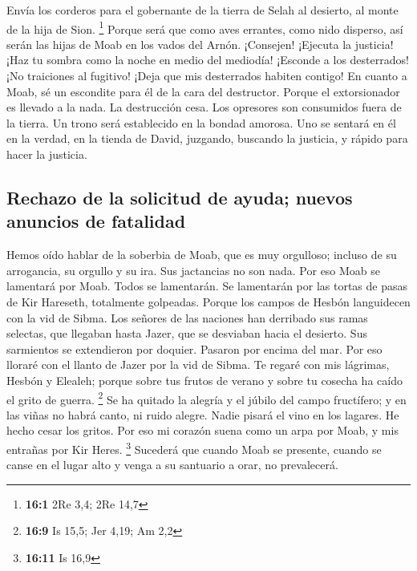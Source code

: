 \begin{paracol}{2}
 Envía los corderos para el gobernante de la tierra de
Selah al desierto, al monte de la hija de Sion. \footnote{\textbf{16:1}
  2Re 3,4; 2Re 14,7}  Porque será que como aves errantes,
como nido disperso, así serán las hijas de Moab en los vados del Arnón.
 ¡Consejen! ¡Ejecuta la justicia! ¡Haz tu sombra como la
noche en medio del mediodía! ¡Esconde a los desterrados! ¡No traiciones
al fugitivo!  ¡Deja que mis desterrados habiten contigo!
En cuanto a Moab, sé un escondite para él de la cara del destructor.
Porque el extorsionador es llevado a la nada. La destrucción cesa. Los
opresores son consumidos fuera de la tierra.  Un trono
será establecido en la bondad amorosa. Uno se sentará en él en la
verdad, en la tienda de David, juzgando, buscando la justicia, y rápido
para hacer la justicia.

\hypertarget{rechazo-de-la-solicitud-de-ayuda-nuevos-anuncios-de-fatalidad}{%
\subsection{Rechazo de la solicitud de ayuda; nuevos anuncios de
fatalidad}\label{rechazo-de-la-solicitud-de-ayuda-nuevos-anuncios-de-fatalidad}}

 Hemos oído hablar de la soberbia de Moab, que es muy
orgulloso; incluso de su arrogancia, su orgullo y su ira. Sus jactancias
no son nada.  Por eso Moab se lamentará por Moab. Todos se
lamentarán. Se lamentarán por las tortas de pasas de Kir Hareseth,
totalmente golpeadas.  Porque los campos de Hesbón
languidecen con la vid de Sibma. Los señores de las naciones han
derribado sus ramas selectas, que llegaban hasta Jazer, que se desviaban
hacia el desierto. Sus sarmientos se extendieron por doquier. Pasaron
por encima del mar.  Por eso lloraré con el llanto de
Jazer por la vid de Sibma. Te regaré con mis lágrimas, Hesbón y Elealeh;
porque sobre tus frutos de verano y sobre tu cosecha ha caído el grito
de guerra. \footnote{\textbf{16:9} Is 15,5; Jer 4,19; Am 2,2}
 Se ha quitado la alegría y el júbilo del campo
fructífero; y en las viñas no habrá canto, ni ruido alegre. Nadie pisará
el vino en los lagares. He hecho cesar los gritos.  Por
eso mi corazón suena como un arpa por Moab, y mis entrañas por Kir
Heres. \footnote{\textbf{16:11} Is 16,9}  Sucederá que
cuando Moab se presente, cuando se canse en el lugar alto y venga a su
santuario a orar, no prevalecerá.


\end{paracol}
